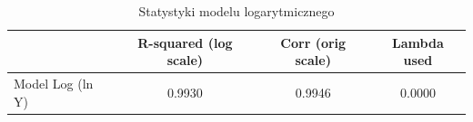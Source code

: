 \begin{table}[H]
\caption{Statystyki modelu logarytmicznego}
\label{tab:zad4_log}
\begin{tabular}{lccc}
\toprule
 & R-squared (log scale) & Corr (orig scale) & Lambda used \\
\midrule
Model Log (ln Y) & 0.9930 & 0.9946 & 0.0000 \\
\bottomrule
\end{tabular}
\end{table}
